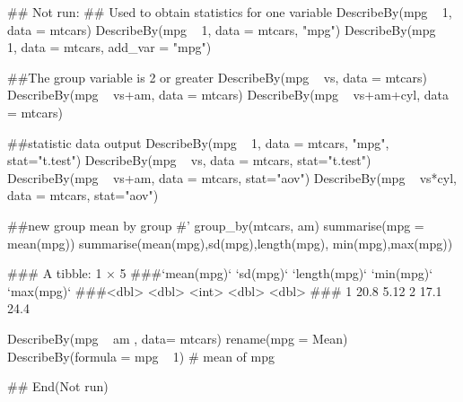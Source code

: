 \documentclass[a4paper]{book}
\begin{document}
\begin{Examples}
\begin{ExampleCode}
\#\# Not run: 
## Used to obtain statistics for one variable
DescribeBy(mpg ~ 1, data = mtcars)
DescribeBy(mpg ~ 1, data = mtcars, "mpg")
DescribeBy(mpg ~ 1, data = mtcars, add_var = "mpg")

##The group variable is 2 or greater
DescribeBy(mpg ~ vs, data = mtcars)
DescribeBy(mpg ~ vs+am, data = mtcars)
DescribeBy(mpg ~ vs+am+cyl, data = mtcars)

##statistic data output
DescribeBy(mpg ~ 1, data = mtcars, "mpg", stat="t.test")
DescribeBy(mpg ~ vs, data = mtcars, stat="t.test")
DescribeBy(mpg ~ vs+am, data = mtcars, stat="aov")
DescribeBy(mpg ~ vs*cyl, data = mtcars, stat="aov")

##new group mean by group
#' group_by(mtcars, am) %
 summarise(mpg = mean(mpg)) %
  summarise(mean(mpg),sd(mpg),length(mpg), min(mpg),max(mpg))

### A tibble: 1 × 5
###`mean(mpg)` `sd(mpg)` `length(mpg)` `min(mpg)` `max(mpg)`
###<dbl>     <dbl>         <int>      <dbl>      <dbl>
###  1        20.8      5.12             2       17.1       24.4

DescribeBy(mpg ~ am , data= mtcars) %
    rename(mpg = Mean) %
      DescribeBy(formula = mpg ~ 1)  # mean of mpg

## End(Not run)



\end{ExampleCode}
\end{Examples}
\end{document}

